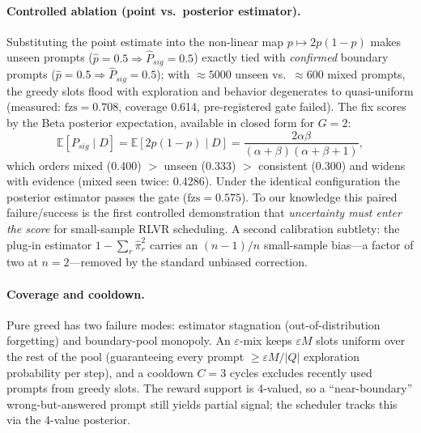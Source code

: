\documentclass[11pt]{article}
\theoremstyle{definition}
\newcommand{\fzs}{\text{fzs}}
\begin{document}
\paragraph{Controlled ablation (point vs.\ posterior estimator).} Substituting the
point estimate into the non-linear map $p\mapsto2p(1-p)$ makes unseen prompts
($\hat p{=}0.5\Rightarrow\hat P_{sig}{=}0.5$) exactly tied with
\emph{confirmed} boundary prompts ($\hat p{=}0.5\Rightarrow\hat P_{sig}{=}0.5$);
with ${\approx}5000$ unseen vs.\ ${\approx}600$ mixed prompts, the greedy slots
flood with exploration and behavior degenerates to quasi-uniform (measured:
$\fzs{=}0.708$, coverage 0.614, pre-registered gate failed). The fix scores by
the Beta posterior expectation, available in closed form for $G{=}2$:
\begin{equation}\label{eq:posterior}
\mathbb{E}[P_{sig}\mid D]
= \mathbb{E}[2p(1-p)\mid D]
= \frac{2\alpha\beta}{(\alpha+\beta)(\alpha+\beta+1)},
\end{equation}
which orders mixed (0.400) $>$ unseen (0.333) $>$ consistent (0.300) and widens
with evidence (mixed seen twice: 0.4286). Under the identical configuration the
posterior estimator passes the gate ($\fzs{=}0.575$). To our knowledge this
paired failure/success is the first controlled demonstration that
\emph{uncertainty must enter the score} for small-sample RLVR scheduling.
A second calibration subtlety: the plug-in estimator $1-\sum_r\hat\pi_r^2$ carries
an $(n{-}1)/n$ small-sample bias---a factor of two at $n{=}2$---removed by the
standard unbiased correction.

\paragraph{Coverage and cooldown.} Pure greed has two failure modes: estimator
stagnation (out-of-distribution forgetting) and boundary-pool monopoly. An
$\varepsilon$-mix keeps $\varepsilon M$ slots uniform over the rest of the pool
(guaranteeing every prompt $\ge\varepsilon M/|Q|$ exploration probability per
step), and a cooldown $C{=}3$ cycles excludes recently used prompts from greedy
slots. The reward support is 4-valued, so a ``near-boundary'' wrong-but-answered
prompt still yields partial signal; the scheduler tracks this via the 4-value
posterior.
\end{document}

